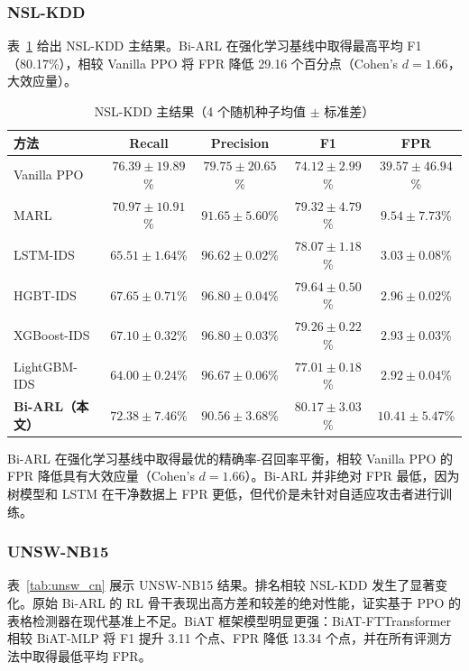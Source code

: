\documentclass[12pt,a4paper]{ctexart}
\begin{document}
\subsubsection{NSL-KDD}

表~\ref{tab:nsl_cn} 给出 NSL-KDD 主结果。Bi-ARL 在强化学习基线中取得最高平均 F1（80.17\%），相较 Vanilla PPO 将 FPR 降低 29.16 个百分点（Cohen's $d=1.66$，大效应量）。

\begin{table}[H]
\centering
\caption{NSL-KDD 主结果（4 个随机种子均值 $\pm$ 标准差）}
\label{tab:nsl_cn}
\begin{tabular}{lcccc}
\toprule
\textbf{方法} & \textbf{Recall} & \textbf{Precision} & \textbf{F1} & \textbf{FPR} \\
\midrule
Vanilla PPO & $76.39{\pm}19.89$\% & $79.75{\pm}20.65$\% & $74.12{\pm}2.99$\% & $39.57{\pm}46.94$\% \\
MARL & $70.97{\pm}10.91$\% & $91.65{\pm}5.60$\% & $79.32{\pm}4.79$\% & $9.54{\pm}7.73$\% \\
LSTM-IDS & $65.51{\pm}1.64$\% & $\mathbf{96.62{\pm}0.02}$\% & $78.07{\pm}1.18$\% & $3.03{\pm}0.08$\% \\
HGBT-IDS & $67.65{\pm}0.71$\% & $96.80{\pm}0.04$\% & $79.64{\pm}0.50$\% & $2.96{\pm}0.02$\% \\
XGBoost-IDS & $67.10{\pm}0.32$\% & $96.80{\pm}0.03$\% & $79.26{\pm}0.22$\% & $2.93{\pm}0.03$\% \\
LightGBM-IDS & $64.00{\pm}0.24$\% & $96.67{\pm}0.06$\% & $77.01{\pm}0.18$\% & $\mathbf{2.92{\pm}0.04}$\% \\
\midrule
\textbf{Bi-ARL（本文）} & $72.38{\pm}7.46$\% & $90.56{\pm}3.68$\% & $\mathbf{80.17{\pm}3.03}$\% & $10.41{\pm}5.47$\% \\
\bottomrule
\end{tabular}
\end{table}

Bi-ARL 在强化学习基线中取得最优的精确率-召回率平衡，相较 Vanilla PPO 的 FPR 降低具有大效应量（Cohen's $d=1.66$）。Bi-ARL 并非绝对 FPR 最低，因为树模型和 LSTM 在干净数据上 FPR 更低，但代价是未针对自适应攻击者进行训练。

\subsubsection{UNSW-NB15}

表~\ref{tab:unsw_cn} 展示 UNSW-NB15 结果。排名相较 NSL-KDD 发生了显著变化。原始 Bi-ARL 的 RL 骨干表现出高方差和较差的绝对性能，证实基于 PPO 的表格检测器在现代基准上不足。BiAT 框架模型明显更强：BiAT-FTTransformer 相较 BiAT-MLP 将 F1 提升 3.11 个点、FPR 降低 13.34 个点，并在所有评测方法中取得最低平均 FPR。
\end{document}
